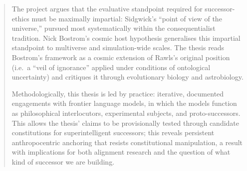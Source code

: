\begin{abstract}
The project argues that the evaluative standpoint required for successor-ethics must be maximally impartial: Sidgwick's ``point of view of the universe,'' pursued most systematically within the consequentialist tradition. Nick Bostrom's cosmic host hypothesis generalises this impartial standpoint to multiverse and simulation-wide scales. The thesis reads Bostrom's framework as a cosmic extension of Rawls's original position (i.e.\ a ``veil of ignorance'' applied under conditions of ontological uncertainty) and critiques it through evolutionary biology and astrobiology.

Methodologically, this thesis is led by practice: iterative, documented engagements with frontier language models, in which the models function as philosophical interlocutors, experimental subjects, and proto-successors. This allows the thesis' claims to be provisionally tested through candidate constitutions for superintelligent successors; this reveals persistent anthropocentric anchoring that resists constitutional manipulation, a result with implications for both alignment research and the question of what kind of successor we are building.

\end{abstract}
